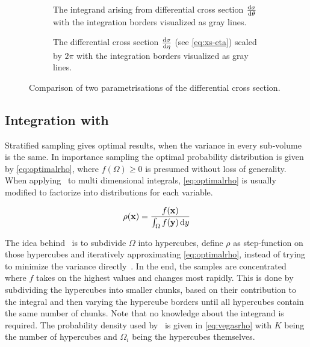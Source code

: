 \begin{figure}[ht]
  \centering
  \begin{subfigure}[c]{.49\textwidth}
    \caption[\(2\pi\dv{\sigma}{\theta}\) with integration
    boundaries]{\label{fig:xs-int-theta} The integrand arising from
      differential cross section \(\dv{\sigma}{\theta}\) with the
      integration borders visualized as gray lines.}
  \end{subfigure}
  \begin{subfigure}[c]{.49\textwidth}
    \caption[Differential cross section for \(\qqgg\) with integration
    boundaries]{\label{fig:xs-int-eta} The differential cross section
      \(\dv{\sigma}{\eta}\) (see \cref{eq:xs-eta}) scaled by \(2\pi\)
      with the integration borders visualized as gray lines.}
  \end{subfigure}
  \caption{\label{fig:xs-int-comp} Comparison of two parametrisations
    of the differential cross section.}
\end{figure}

\subsection{Integration with \vegas}
\label{sec:mcintvegas}

Stratified sampling gives optimal results, when the variance in every
sub-volume is the same\cite{Lepage:19781an}. In importance sampling
the optimal probability distribution is given
by \cref{eq:optimalrho}, where \(f(\Omega) \geq 0\) is presumed
without loss of generality. When applying \vegas\ to multi dimensional
integrals, \cref{eq:optimalrho} is usually modified to factorize into
distributions for each variable.

\begin{equation}
  \label{eq:optimalrho}
  \rho(\vb{x}) = \frac{f(\vb{x})}{\int_\Omega f(\vb{y})\dd{y}}
\end{equation}

The idea behind \vegas\ is to subdivide \(\Omega\) into hypercubes,
define \(\rho\) as step-function on those hypercubes and iteratively
approximating \cref{eq:optimalrho}, instead of trying to minimize the
variance directly~\cite{Lepage:19781an}. In the end, the samples are
concentrated where \(f\) takes on the highest values and changes most
rapidly. This is done by subdividing the hypercubes into smaller
chunks, based on their contribution to the integral and then varying
the hypercube borders until all hypercubes contain the same number of
chunks. Note that no knowledge about the integrand is required. The
probability density used by \vegas\ is given in \cref{eq:vegasrho}
with \(K\) being the number of hypercubes and \(\Omega_i\) being the
hypercubes themselves.


